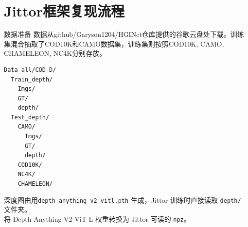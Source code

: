 
\section{Jittor框架复现流程}
\begin{frame}[fragile]{数据准备}
  \vspace{0.2em}
  \small
  数据从github/Garyson1204/HGINet仓库提供的谷歌云盘处下载。训练集混合抽取了COD10K和CAMO数据集，训练集则按照COD10K, CAMO, CHAMELEON,  NC4K分别存放。
  \vspace{0.5em}
  \scriptsize
\begin{lstlisting}[style=pythoncode]
Data_all/COD-D/
  Train_depth/
    Imgs/
    GT/
    depth/
  Test_depth/
    CAMO/
      Imgs/
      GT/
      depth/
    COD10K/
    NC4K/
    CHAMELEON/
\end{lstlisting}

  \vspace{0.5em}
  \small
  深度图由用\texttt{depth\_anything\_v2\_vitl.pth} 生成，Jittor 训练时直接读取 \texttt{depth/} 文件夹。 \\
  将 Depth Anything V2 ViT-L 权重转换为 Jittor 可读的 \texttt{npz}。
\end{frame}



